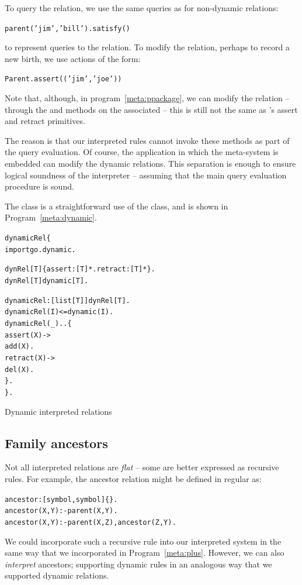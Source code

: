 To query the  relation, we use the same queries as for non-dynamic relations:
\begin{alltt}
parent('jim','bill').satisfy()
\end{alltt}
to represent queries to the  relation.
To modify the relation, perhaps to record a new birth, we use actions of the form:
\begin{alltt}
Parent.assert(('jim','joe'))
\end{alltt}

\begin{aside}
Note that, although, in program~\vref{meta:ppackage}, we can modify the  relation -- through the  and  methods on the associated  --  this is still not the same as \prolog's assert and retract primitives.

The reason is that our interpreted rules cannot invoke these methods as part of the query evaluation. Of course, the application in which the meta-system is embedded can modify the dynamic relations. This separation is enough to ensure logical soundness of the interpreter -- assuming that the main query evaluation procedure is sound.
\end{aside}

The  class is a straightforward use of the  class, and is shown in Program~\vref{meta:dynamic}.

\begin{program}
\vspace{0.5ex}
\begin{alltt}
dynamicRel\{
  import go.dynamic.

  dynRel[T] \impl{} \{ assert:[T]*. retract:[T]* \}.
  dynRel[T] \impl{} dynamic[T].

  dynamicRel:[list[T]]\sconarrow{}dynRel[T].
  dynamicRel(I) <= dynamic(I).
  dynamicRel(_)..\{
    assert(X) ->
        add(X).
    retract(X) ->
    	    del(X).
  \}.
\}.
\end{alltt}
\vspace{-2ex}
\caption{Dynamic interpreted relations}
\label{meta:dynamic}
\end{program}

\subsection{Family ancestors}
\label{meta:ancestor}
Not all interpreted relations are \emph{flat} -- some are better expressed as recursive rules. For example, the ancestor relation might be defined in regular \go as:
\begin{alltt}
ancestor:[symbol,symbol]\{\}.
ancestor(X,Y) :- parent(X,Y).
ancestor(X,Y) :- parent(X,Z), ancestor(Z,Y).
\end{alltt}
We could incorporate such a recursive rule into our interpreted system in the same way that we incorporated  in Program~\vref{meta:plus}. However, we can also \emph{interpret} ancestors; supporting dynamic rules in an analogous way that we supported dynamic relations. 

